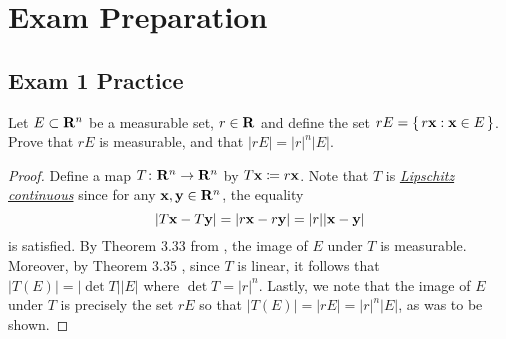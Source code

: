 \section{Exam Preparation}
\subsection{Exam 1 Practice}
\begin{problem}
Let $E\subset\mathbf{R}^n$ be a measurable set, $r\in\mathbf{R}$ and define the set
$rE=\left\{\,r\mathbf{x}:\mathbf{x}\in E\,\right\}$. Prove that $rE$ is
measurable, and that $|rE|=|r|^n|E|$.
\end{problem}
\begin{proof}
Define a map $T\colon\mathbf{R}^n\to\mathbf{R}^n$ by $T\mathbf{x}\coloneqq r\mathbf{x}$. Note
that $T$ is
\href{https://en.wikipedia.org/wiki/Lipschitz_continuity}{\emph{Lipschitz
    continuous}} since for any $\mathbf{x},\mathbf{y}\in\mathbf{R}^n$, the equality
\begin{equation}
\label{eq:prep:1:1}
|T\mathbf{x}-T\mathbf{y}|=|r\mathbf{x}-r\mathbf{y}|=|r||\mathbf{x}-\mathbf{y}|
\end{equation}
is satisfied. By Theorem 3.33 from \cite[Ch.\@ 3, p.\@55]{wheeden-zygmund},
the image of $E$ under $T$ is measurable. Moreover, by Theorem 3.35
\cite[Ch.\@ 3, p.\@ 56]{wheeden-zygmund}, since $T$ is linear, it follows
that $|T(E)|=|{\det T}||E|$ where $\det T=|r|^n$. Lastly, we note that the
image of $E$ under $T$ is precisely the set $rE$ so that
$|T(E)|=|rE|=|r|^n|E|$, as was to be shown.
\end{proof}

